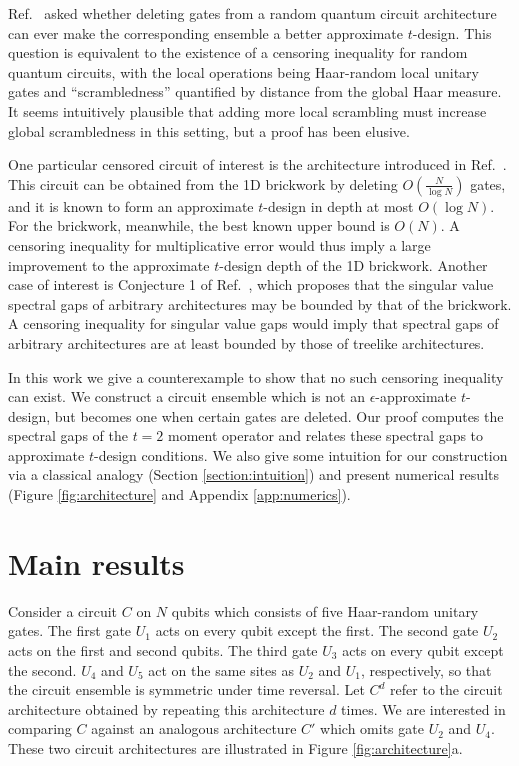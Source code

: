\documentclass[aps,prx,floatfix,nofootinbib,superscriptaddress,longbibliography]{revtex4-2}
\begin{document}
Ref.~ asked whether deleting gates from a random quantum circuit architecture can ever make the corresponding ensemble a better approximate $t$-design. This question is equivalent to the existence of a censoring inequality for random quantum circuits, with the local operations being Haar-random local unitary gates and ``scrambledness'' quantified by distance from the global Haar measure. It seems intuitively plausible that adding more local scrambling must increase global scrambledness in this setting, but a proof has been elusive. 

One particular censored circuit of interest is the architecture introduced in Ref.~\cite{Schuster2024}. This circuit can be obtained from the 1D brickwork by deleting $O\left(\frac{N}{\log N}\right)$ gates, and it is known to form an approximate $t$-design in depth at most $O(\log N)$. For the brickwork, meanwhile, the best known upper bound is $O(N)$. A censoring inequality for multiplicative error would thus imply a large improvement to the approximate $t$-design depth of the 1D brickwork. Another case of interest is Conjecture 1 of Ref.~, which proposes that the singular value spectral gaps of arbitrary architectures may be bounded by that of the brickwork. A censoring inequality for singular value gaps would imply that spectral gaps of arbitrary architectures are at least bounded by those of treelike architectures. 
 
In this work we give a counterexample to show that no such censoring inequality can exist. We construct a circuit ensemble which is not an $\epsilon$-approximate $t$-design, but becomes one when certain gates are deleted. Our proof computes the spectral gaps of the $t=2$ moment operator and relates these spectral gaps to approximate $t$-design conditions. We also give some intuition for our construction via a classical analogy (Section \ref{section:intuition}) and present numerical results (Figure \ref{fig:architecture} and Appendix \ref{app:numerics}).

\section{Main results}
Consider a circuit $C$ on $N$ qubits which consists of five Haar-random unitary gates. The first gate $U_1$ acts on every qubit except the first. The second gate $U_2$ acts on the first and second qubits. The third gate $U_3$ acts on every qubit except the second. $U_4$ and $U_5$ act on the same sites as $U_2$ and $U_1$, respectively, so that the circuit ensemble is symmetric under time reversal. Let $C^{d}$ refer to the circuit architecture obtained by repeating this architecture $d$ times. We are interested in comparing $C$ against an analogous architecture $C'$ which omits gate $U_2$ and $U_4$. These two circuit architectures are illustrated in Figure \ref{fig:architecture}a.
\end{document}
